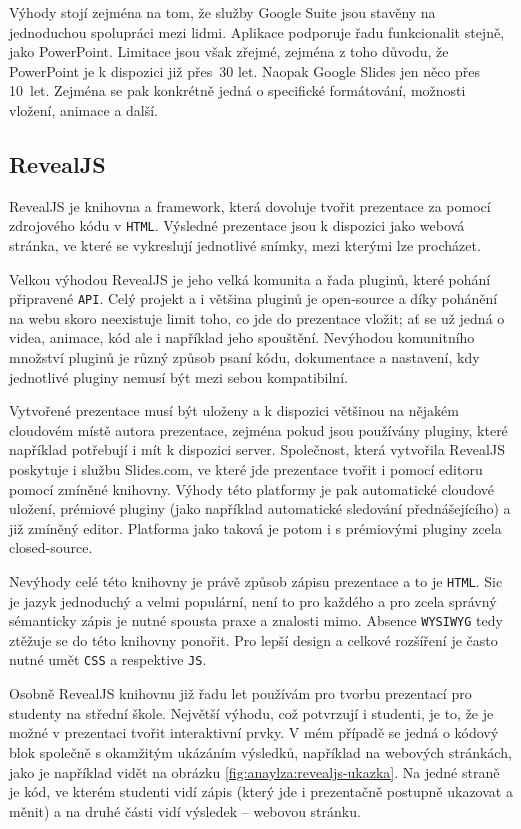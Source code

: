 Výhody stojí zejména na tom, že služby Google Suite jsou stavěny na jednoduchou spolupráci mezi lidmi. 
Aplikace podporuje řadu funkcionalit stejně, jako PowerPoint. 
Limitace jsou však zřejmé, zejména z toho důvodu, že PowerPoint je k dispozici již přes~30 let. Naopak Google Slides jen něco přes 10~let. 
Zejména se pak konkrétně jedná o specifické formátování, možnosti vložení, animace a další.

\subsection{RevealJS}

RevealJS je knihovna a framework, která dovoluje tvořit prezentace za pomocí zdrojového kódu v \texttt{HTML}. 
Výsledné prezentace jsou k dispozici jako webová stránka, ve které se vykreslují jednotlivé snímky, mezi kterými lze procházet. 

Velkou výhodou RevealJS je jeho velká komunita a řada pluginů, které pohání připravené \texttt{API}. 
Celý projekt a i většina pluginů je open-source a díky pohánění na webu skoro neexistuje limit toho, co jde do prezentace vložit; ať se už jedná o videa, animace, kód ale i například jeho spouštění. 
Nevýhodou komunitního množství pluginů je různý způsob psaní kódu, dokumentace a nastavení, kdy jednotlivé pluginy nemusí být mezi sebou kompatibilní. 

Vytvořené prezentace musí být uloženy a k dispozici většinou na nějakém cloudovém místě autora prezentace, zejména pokud jsou používány pluginy, které například potřebují i mít k dispozici server.
Společnost, která vytvořila RevealJS poskytuje i službu Slides.com, ve které jde prezentace tvořit i pomocí editoru pomocí zmíněné knihovny.
Výhody této platformy je pak automatické cloudové uložení, prémiové pluginy (jako například automatické sledování přednášejícího) a již zmíněný editor. Platforma jako taková je potom i s prémiovými pluginy zcela closed-source.

Nevýhody celé této knihovny je právě způsob zápisu prezentace a to je \texttt{HTML}.
Sic je jazyk jednoduchý a velmi populární, není to pro každého a pro zcela správný sémanticky zápis je nutné spousta praxe a znalosti mimo.
Absence \texttt{WYSIWYG} tedy ztěžuje se do této knihovny ponořit.
Pro lepší design a celkové rozšíření je často nutné umět \texttt{CSS} a respektive \texttt{JS}.

Osobně RevealJS knihovnu již řadu let používám pro tvorbu prezentací pro studenty na střední škole.
Největší výhodu, což potvrzují i studenti, je to, že je možné v prezentaci tvořit interaktivní prvky.
V mém případě se jedná o kódový blok společně s okamžitým ukázáním výsledků, například na webových stránkách, jako je například vidět na obrázku \ref{fig:anaylza:revealjs-ukazka}.
Na jedné straně je kód, ve kterém studenti vidí zápis (který jde i prezentačně postupně ukazovat a měnit) a na druhé části vidí výsledek -- webovou stránku.

